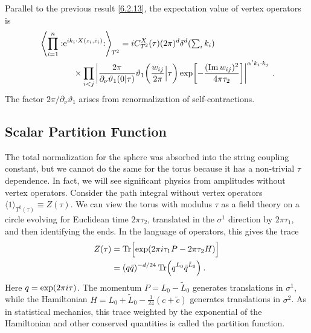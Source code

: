 Parallel to the previous result \eqref{6.2.13}, the expectation value of vertex operators is 
\begin{align}
	& \left\langle\prod_{i=1}^{n}: \mathrel{\mathrm{e}^{i k_{i} \cdot X(z_{i}, \bar{z}_{i})}}:\right\rangle \bigg._{\!\!T^{2}} 
	=i C_{T^{2}}^{X}(\tau)(2 \pi)^{d} \delta^{d}({\textstyle \sum_{i} k_{i}}) \nonumber \\
	&\qquad \qquad  \times \prod_{i<j}\left|\frac{2 \pi}{\partial_{\nu} \vartheta_{1}(0 \vert \tau)} 
	\vartheta_{1}\biggl(\frac{w_{i j}}{2 \pi} \Big\vert \tau\biggr) \exp 
	\biggl[-\frac{(\operatorname{Im} w_{i j})^{2}}{4 \pi \tau_{2}}\biggr]\right|^{\alpha^{\prime} k_{i} \cdot k_{j}} \:. \label{7.2.4} 
\end{align}
The factor $2 \pi / \partial_{\nu} \vartheta_{1}$ arises from renormalization of self-contractions. 

\subsection*{Scalar Partition Function} 
The total normalization for the sphere was absorbed into the string coupling constant, but we cannot do the same for the torus because it has a non-trivial $\tau$ dependence. 
In fact, we will see significant physics from amplitudes without vertex operators. 
Consider the path integral without vertex operators $\langle 1\rangle_{T^{2}(\tau)} \equiv Z(\tau) $. 
We can view the torus with modulus $\tau$ as a field theory on a circle evolving for Euclidean time $2 \pi \tau_{2}$, translated in the $\sigma^{1}$ direction by $2 \pi \tau_{1}$, and then identifying the ends. 
In the language of operators, this gives the trace 
\begin{align}
	Z(\tau) &=\operatorname{Tr}\Bigl[\exp (2 \pi i \tau_{1} P-2 \pi \tau_{2} H)\Bigr] \nonumber \\
	&=(q \bar{q})^{-d / 24} \operatorname{Tr}\Bigl(q^{L_{0}} \bar{q}^{\tilde{L}_{0}}\Bigr) \:. \label{7.2.5} 
\end{align}
Here $q=\exp (2 \pi i \tau)$. The momentum $P=L_{0}-\tilde{L}_{0}$ generates translations in $\sigma^{1}$, while the Hamiltonian $H=L_{0}+\tilde{L}_{0}-\frac{1}{24}(c+\tilde{c})$ generates translations in $\sigma^{2}$. 
As in statistical mechanics, this trace weighted by the exponential of the Hamiltonian and other conserved quantities is called the partition function. 

